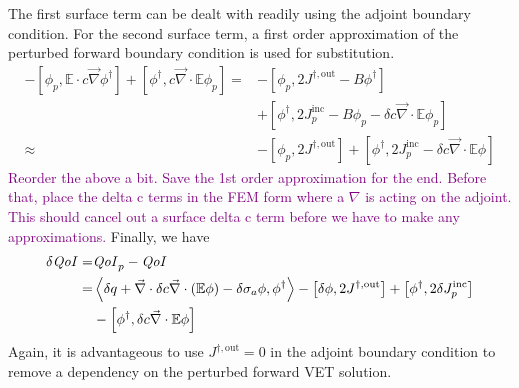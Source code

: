 \documentclass[12pt]{report}
\newcommand{\bra}{\left\langle}
\newcommand{\ket}{\right\rangle}
\newcommand{\sbra}{\left[}
\newcommand{\sket}{\right]}
\renewcommand{\div}{\vec{\nabla} \cdot}
\newcommand{\grad}{\vec{\nabla}}
\newcommand{\Edd}{\mathbb{E}}
\newcommand{\siga}{\sigma_a}
\newcommand{\isigt}{c}
\newcommand{\scalSource}{q}
\newcommand{\qoi}{{\it QoI}\xspace}
\newcommand{\comment}[2]{\marginpar{\textcolor{#2}{$\star$}}\textcolor{#2}{#1}\newline}
\newcommand{\todo}[1]{\comment{#1}{purple}}
\newcommand{\todo}[1]{\phantom{a}}
\begin{document}
The first surface term can be dealt with readily using the adjoint boundary condition. For the second surface term, a first order approximation of the perturbed forward boundary condition is used for substitution.
\begin{equation}
\begin{split}
 - \sbra \phi_p, \Edd \cdot \isigt \grad \phi^\dag \sket  + \sbra \phi^\dag, \isigt \div \Edd \phi_p \sket 
=&- \sbra \phi_p, 2J^{\dag,\text{out}} - B \phi^\dag \sket \\ &+ \sbra \phi^\dag, 2 J_p^{\text{inc}} - B \phi_p - \delta \isigt \div \Edd \phi_p \sket \\
\approx&- \sbra \phi_p, 2J^{\dag,\text{out}} \sket + \sbra \phi^\dag, 2 J_p^{\text{inc}} - \delta \isigt \div \Edd \phi \sket 
\end{split}
\end{equation}
\todo{Reorder the above a bit. Save the 1st order approximation for the end. Before that, place the delta c terms in the FEM form where a $\nabla$ is acting on the adjoint. This should cancel out a surface delta c term before we have to make any approximations.}
Finally, we have
\begin{equation}
\label{QoIVETAdj}
\begin{split}
\delta \qoi =& \qoi_p - \qoi \\ 
=& \bra \delta \scalSource + \div \delta \isigt \div \left( \Edd \phi \right)  - \delta \siga \phi, \phi^\dag \ket 
- \sbra \delta \phi, 2J^{\dag,\text{out}} \sket + \sbra \phi^\dag, 2 \delta J_p^{\text{inc}} \sket \\
& - \sbra \phi^\dag, \delta \isigt \div \Edd \phi \sket 
\end{split}
\end{equation}
Again, it is advantageous to use $J^{\dag,\text{out}}=0$ in the adjoint boundary condition to remove a dependency on the 
perturbed forward VET solution.
\end{document}
